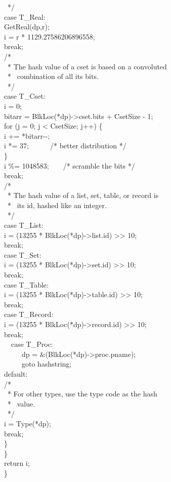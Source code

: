 \begin{iconcode}
\>\>\>\ */\\
\>\>\>case T\_Real:\\
\>\>\>\>GetReal(dp,r);\\
\>\>\>\>i = r * 1129.27586206896558;\\
\>\>\>\>break;\\
\>\>\>/*\\
\>\>\>\ * The hash value of a cset is based on a convoluted \\
\>\>\>\ * \ combination of all its bits.\\
\>\>\>\ */\\
\>\>\>case T\_Cset:\\
\>\>\>\>i = 0;\\
\>\>\>\>bitarr = BlkLoc(*dp)->cset.bits + CsetSize - 1;\\
\>\>\>\>for (j = 0; j < CsetSize; j++) \{\\
\>\>\>\>\>i += *bitarr-{}-;\\
\>\>\>\>\>i *= 37;\ \ \ \ \ \ /* better distribution */\\
\>\>\>\>\>\}\\
\>\>\>\>i \%= 1048583;\ \ \ \ /* scramble the bits */\\
\>\>\>\>break;\\
\>\>\>/*\\
\>\>\>\ * The hash value of a list, set, table, or record is \\
\>\>\>\ * \ its id, hashed like an integer.\\
\>\>\>\ */\\
\>\>\>case T\_List:\\
\>\>\>\>i = (13255 * BlkLoc(*dp)->list.id) >> 10;\\
\>\>\>\>break;\\
\>\>\>case T\_Set:\\
\>\>\>\>i = (13255 * BlkLoc(*dp)->set.id) >> 10;\\
\>\>\>\>break;\\
\>\>\>case T\_Table:\\
\>\>\>\>i = (13255 * BlkLoc(*dp)->table.id) >> 10;\\
\>\>\>\>break;\\
\>\>\>case T\_Record:\\
\>\>\>\>i = (13255 * BlkLoc(*dp)->record.id) >> 10;\\
\>\>\>\>break;\\
\ \  case T\_Proc:\\
\ \  \ \ \ dp = \&(BlkLoc(*dp)->proc.pname);\\
\ \  \ \ \ goto hashstring;\\
\>\>\>default:\\
\>\>\>\>/*\\
\>\>\>\>\ * For other types, use the type code as the hash\\
\>\>\>\>\ * \ value.\\
\>\>\>\>\ */\\
\>\>\>\>i = Type(*dp);\\
\>\>\>\>break;\\
\>\>\>\}\\
\>\>\}\\
\>return i;\\
\>\}
\end{iconcode}

